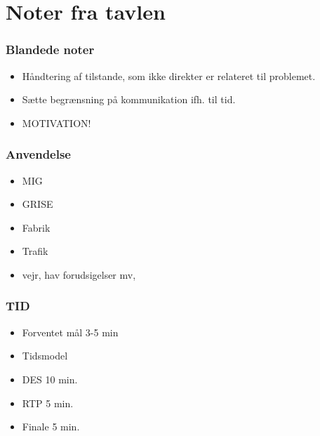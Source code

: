 \documentclass{beamer}
\begin{document}
\section{Noter fra tavlen}
\begin{frame}
  \frametitle{Blandede noter}
  \begin{itemize}
    \item Håndtering af tilstande, som ikke direkter er relateret til problemet.
    \item Sætte begrænsning på kommunikation ifh. til tid.
    \item MOTIVATION!
  \end{itemize}
\end{frame}

\begin{frame}
  \frametitle{Anvendelse}
  \begin{itemize}
	\item MIG
	\item GRISE
	\item Fabrik
	\item Trafik
	\item vejr, hav forudsigelser mv,
  \end{itemize}
\end{frame}


\begin{frame}
  \frametitle{TID}
  \begin{itemize}
	\item Forventet mål 3-5 min
	\item Tidsmodel
	\item DES 10 min.
	\item RTP 5 min.
	\item Finale 5 min.
  \end{itemize}
\end{frame}
\end{document}

